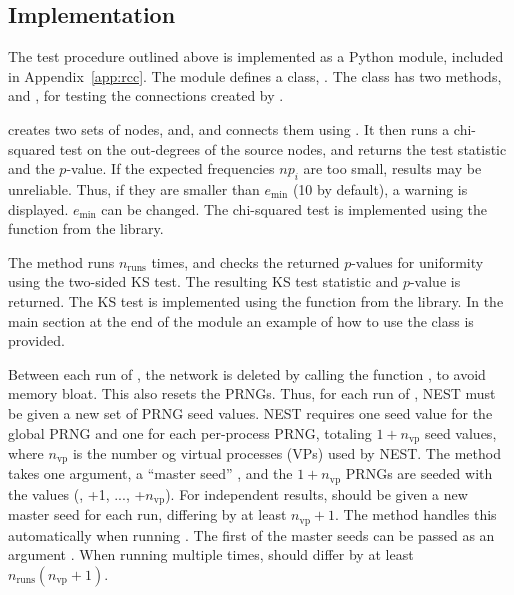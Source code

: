 \subsection{Implementation\label{subsec:rccimp}}

The test procedure outlined above is implemented as a Python module, included in Appendix~\ref{app:rcc}. The module defines a class, . The class has two methods,  and , for testing the connections created by . 

 creates two sets of nodes,  and\linebreak {}, and connects them using . It then runs a chi-squared test on the out-degrees of the source nodes, and returns the test statistic and the $p$-value. If the expected frequencies $np_i$ are too small, results may be unreliable. Thus, if they are smaller than $e_{\text{min}}$ (10 by default), a warning is displayed. $e_{\text{min}}$ can be changed. The chi-squared test is implemented using the  function from the  library. 

The method  runs  $n_\text{runs}\label{eq:nruns}$ times, and checks the returned $p$-values for uniformity using the two-sided KS test. The resulting KS test statistic and $p$-value is returned. The KS test is implemented using the  function from the  library. In the main section at the end of the module an example of how to use the  class is provided.

Between each run of , the network is deleted by calling the function , to avoid memory bloat. This also resets the PRNGs. Thus, for each run of , NEST must be given a new set of PRNG seed values. NEST requires one seed value for the global PRNG and one for each per-process PRNG, totaling $1 + n_{\text{vp}}$ seed values, where $n_{\text{vp}}$ is the number og virtual processes (VPs) used by NEST. The  method takes one argument, a ``master seed'' , and the $1 + n_{\text{vp}}$ PRNGs are seeded with the values (, +1, ..., +$n_{\text{vp}}$). For independent results,  should be given a new master seed for each run, differing by at least $n_{\text{vp}}+1$. The  method handles this automatically when running . The first of the master seeds can be passed as an argument . When running  multiple times,  should differ by at least $n_\text{runs} (n_{\text{vp}}+1)$.



